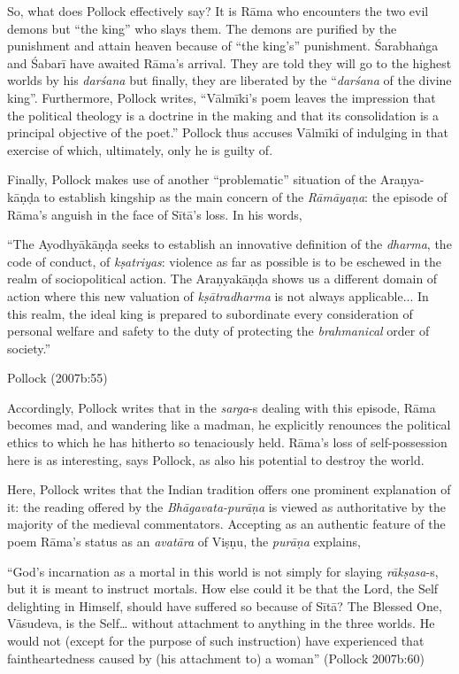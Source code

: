 So, what does Pollock effectively say? It is Rāma who encounters the two evil demons but “the king” who slays them. The demons are purified by the punishment and attain heaven because of “the king’s” punishment. Śarabhaṅga and Śabarī have awaited Rāma’s arrival. They are told they will go to the highest worlds by his {\sl darśana} but finally, they are liberated by the “{\sl darśana} of the divine king”. Furthermore, Pollock writes, “Vālmīki’s poem leaves the impression that the political theology is a doctrine in the making and that its consolidation is a principal objective of the poet.” Pollock thus accuses Vālmīki of indulging in that exercise of which, ultimately, only he is guilty of. 

Finally, Pollock makes use of another “problematic” situation of the Araṇya-kāṇḍa to establish kingship as the main concern of the {\sl Rāmāyaṇa}: the episode of Rāma’s anguish in the face of Sītā’s loss. In his words, 

\begin{myquote}
“The Ayodhyākāṇḍa seeks to establish an innovative definition of the {\sl dharma}, the code of conduct, of {\sl kṣatriyas}: violence as far as possible is to be eschewed in the realm of sociopolitical action. The Araṇyakāṇḍa shows us a different domain of action where this new valuation of {\sl kṣātradharma} is not always applicable... In this realm, the ideal king is prepared to subordinate every consideration of personal welfare and safety to the duty of protecting the {\sl brahmanical} order of society.”

\hfill	 Pollock (2007b:55)
\end{myquote}

Accordingly, Pollock writes that in the {\sl sarga}-s dealing with this episode, Rāma becomes mad, and wandering like a madman, he explicitly renounces the political ethics to which he has hitherto so tenaciously held. Rāma’s loss of self-possession here is as interesting, says Pollock, as also his potential to destroy the world. 


Here, Pollock writes that the Indian tradition offers one prominent explanation of it: the reading offered by the {\sl Bhāgavata-purāṇa} is viewed as authoritative by the majority of the medieval commentators. Accepting as an authentic feature of the poem Rāma’s status as an {\sl avatāra} of Viṣṇu, the {\sl purāṇa} explains, 

\begin{myquote}
“God's incarnation as a mortal in this world is not simply for slaying {\sl rākṣasa}-s, but it is meant to instruct mortals. How else could it be that the Lord, the Self delighting in Himself, should have suffered so because of Sītā? The Blessed One, Vāsudeva, is the Self… without attachment to anything in the three worlds. He would not (except for the purpose of such instruction) have experienced that faintheartedness caused by (his attachment to) a woman” (Pollock 2007b:60)
\end{myquote}

